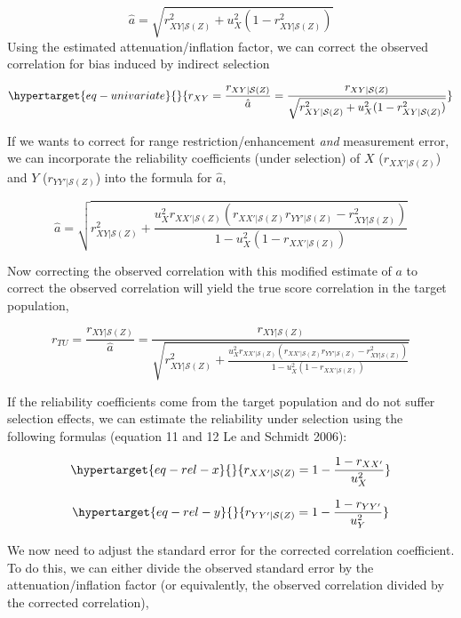 \documentclass[
  letterpaper,
  DIV=11,
  numbers=noendperiod]{scrreprt}
\begin{document}
\[
\hat{a} = \sqrt{r_{XY|\mathcal{S}(Z)}^2 + u_{X}^2 (1- r_{XY|\mathcal{S}(Z)}^2)  }
\] Using the estimated attenuation/inflation factor, we can correct the
observed correlation for bias induced by indirect selection

\begin{equation}\protect\hypertarget{eq-univariate}{}{
r_{XY} = \frac{r_{XY|\mathcal{S}(Z)}}{\hat{a}} = \frac{r_{XY|\mathcal{S}(Z)}}{\sqrt{r_{XY|\mathcal{S}(Z)}^2 + u_{X}^2 (1- r_{XY|\mathcal{S}(Z)}^2)  }}
}\label{eq-univariate}\end{equation}

If we wants to correct for range restriction/enhancement \emph{and}
measurement error, we can incorporate the reliability coefficients
(under selection) of \(X\) (\(r_{XX'|\mathcal{S}(Z)}\)) and \(Y\)
(\(r_{YY'|\mathcal{S}(Z)}\)) into the formula for \(\hat{a}\),

\[
\hat{a} = \sqrt{r_{XY|\mathcal{S}(Z)}^2 + \frac{u_{X}^2 r_{XX'|\mathcal{S}(Z)}\left(r_{XX'|\mathcal{S}(Z)}r_{YY'|\mathcal{S}(Z)} - r_{XY|\mathcal{S}(Z)}^2\right) }{1 - u_{X}^2 \left(1-r_{XX'|\mathcal{S}(Z)}\right)} }
\]

Now correcting the observed correlation with this modified estimate of
\(a\) to correct the observed correlation will yield the true score
correlation in the target population,

\[
r_{TU}=\frac{r_{XY|\mathcal{S}(Z)}}{\hat{a}} = \frac{r_{XY|\mathcal{S}(Z)}}{\sqrt{r_{XY|\mathcal{S}(Z)}^2 + \frac{u_{X}^2 r_{XX'|\mathcal{S}(Z)}\left(r_{XX'|\mathcal{S}(Z)}r_{YY'|\mathcal{S}(Z)} - r_{XY|\mathcal{S}(Z)}^2\right) }{1 - u_{X}^2 \left(1-r_{XX'|\mathcal{S}(Z)}\right)} }}
\]

If the reliability coefficients come from the target population and do
not suffer selection effects, we can estimate the reliability under
selection using the following formulas (equation 11 and 12 Le and
Schmidt 2006):

\begin{equation}\protect\hypertarget{eq-rel-x}{}{
r_{XX'|\mathcal{S}(Z)} = 1-\frac{1-r_{XX'}}{u_X^2}
}\label{eq-rel-x}\end{equation}

\begin{equation}\protect\hypertarget{eq-rel-y}{}{
r_{YY'|\mathcal{S}(Z)} = 1-\frac{1-r_{YY'}}{u_Y^2}
}\label{eq-rel-y}\end{equation}

We now need to adjust the standard error for the corrected correlation
coefficient. To do this, we can either divide the observed standard
error by the attenuation/inflation factor (or equivalently, the observed
correlation divided by the corrected correlation),
\end{document}
